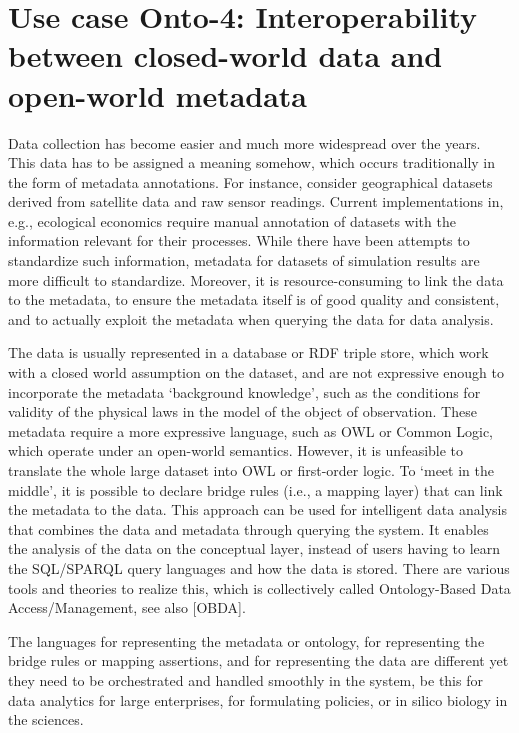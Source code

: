 \documentclass[10pt,%
\ifpretendfinal
final%
\else
draft%
\fi,
]{scrreprt}
\begin{document}
\section{Use case Onto-4: Interoperability between closed-world data and open-world metadata}
Data collection has become easier and much more widespread over the years. This data has to be 
assigned a meaning somehow, which occurs traditionally in the  form of metadata annotations. For 
instance, consider geographical datasets derived from satellite data and raw sensor readings. 
Current implementations in, e.g., ecological economics\cite{bagstad_aries_2011} require manual 
annotation of datasets with the information relevant for their processes. While there have been 
attempts to standardize such information\cite{european_comission_inspire_2014}, metadata for 
datasets of simulation results are more difficult to standardize. Moreover, it is 
resource-consuming to link the data to the metadata, to ensure the metadata itself is of good 
quality and consistent, and to actually exploit the metadata when querying the data for data 
analysis. 

The data is usually represented in a database or RDF triple store, which work with a closed world assumption on the dataset, and are not expressive enough to 
incorporate the metadata `background knowledge', such as the conditions for validity of the physical laws in the model of the object of observation. These metadata 
require a more expressive language, such as OWL or Common Logic, which operate under an open-world semantics. However, it is unfeasible to translate the 
whole large dataset into OWL or first-order logic. To `meet in the middle', it is possible to declare bridge rules (i.e., a mapping layer) that can link the metadata to 
the data. This approach can be used for intelligent data analysis that combines the data and metadata through querying the system. It enables the analysis of the 
data on the conceptual layer, instead of users having to learn the SQL/SPARQL query languages and how the data is stored. There are various tools and theories 
to realize this, which is collectively called Ontology-Based Data Access/Management, see also [OBDA].

The languages for representing the metadata or ontology, for representing the bridge rules or mapping assertions, and for representing the data are different yet 
they need to be orchestrated and handled smoothly in the system, be this for data analytics for large enterprises, for formulating policies, or in silico biology in the 
sciences. 
\end{document}
